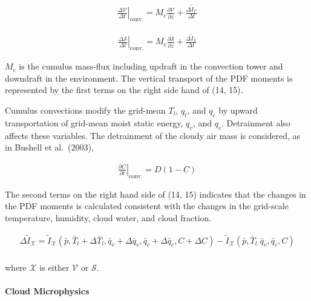 \begin{eqnarray}
\left.\frac{\Delta \mathcal{V}}{\Delta t}\right|_{\mathrm{conv} .}=M_{c} \frac{\partial \mathcal{V}}{\partial z}+\frac{\Delta \tilde{I}_{\mathcal{V}}}{\Delta t}
\label{W09-14}
\end{eqnarray}

\begin{eqnarray}
\left.\frac{\Delta \mathcal{S}}{\Delta t}\right|_{\mathrm{conv} .}=M_{c} \frac{\partial \mathcal{S}}{\partial z}+\frac{\Delta \tilde{I}_{\mathcal{S}}}{\Delta t}
\label{W09-15}
\end{eqnarray}

\(M_c\) is the cumulus mass-flux including updraft in the convection
tower and downdraft in the environment. The vertical transport of the
PDF moments is represented by the first terms on the right side hand of
(14, 15).

Cumulus convections modify the grid-mean \(T_l\), \(q_t\), and \(q_c\)
by upward transportation of grid-mean moist static energy, \(q_v\), and
\(q_c\). Detrainment also affects these variables. The detrainment of
the cloudy air mass is considered, as in Bushell et al.~(2003),

\begin{eqnarray}
\left.\frac{\partial C}{\partial t}\right|_{\mathrm{conv} .}=D(1-C)
\end{eqnarray}

The second terms on the right hand side of (14, 15) indicates that the
changes in the PDF moments is calculated consistent with the changes in
the grid-scale temperature, humidity, cloud water, and cloud fraction.

\begin{eqnarray}
\Delta \tilde{I}_{\mathcal{X}}= \tilde{I}_{\mathcal{X}}\left(\bar{p}, \bar{T}_{l}+\Delta \bar{T}_{l}, \bar{q}_{v}+\Delta \bar{q}_{v}, \bar{q}_{c}+\Delta \bar{q}_{c}, C+\Delta C\right)
-\tilde{I}_{\mathcal{X}}\left(\bar{p}, \bar{T}_{l,} \bar{q}_{v}, \bar{q}_{c}, C\right)
\end{eqnarray}

\begin{eqnarray}
\label{W09-16}
\end{eqnarray} where \(\mathcal{X}\) is either \(\mathcal{V}\) or \(\mathcal{S}\).

\hypertarget{cloud-microphysics}{%
\paragraph{Cloud Microphysics}\label{cloud-microphysics}}

